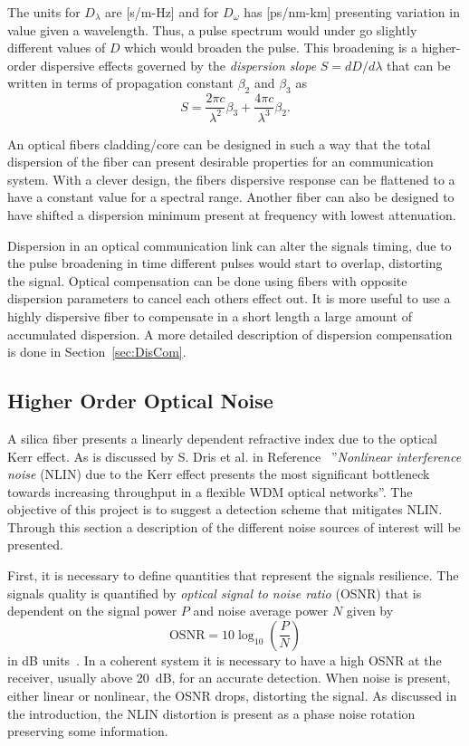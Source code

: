 The units for $D_\lambda$ are [s/m-Hz] and for $D_\omega$ has [ps/nm-km] presenting variation in value given a wavelength. Thus, a pulse spectrum would under go slightly different values of $D$ which would broaden the pulse. This broadening is a higher-order dispersive effects governed by the \emph{dispersion slope}   $S=dD/d\lambda$ that can be written in terms of propagation constant $\beta_2$ and $\beta_3$ as
\begin{equation}
S=\frac{2\pi c}{\lambda^2}\beta_3+\frac{4\pi c}{\lambda^3}\beta_2.
\end{equation}

An optical fibers cladding/core can be designed in such a way that the total dispersion of the fiber can present desirable properties for an communication system. With a clever design, the fibers dispersive response can be flattened to a have a constant value for a spectral range. Another fiber can also be designed to have shifted a dispersion minimum present at frequency with lowest attenuation. 

Dispersion in an optical communication link can alter the signals timing, due to the pulse broadening in time different pulses would start to overlap, distorting the signal. Optical compensation can be done using fibers with opposite dispersion parameters  to cancel each others effect out. It is more useful to use a highly dispersive fiber to compensate in a short length a large amount of accumulated dispersion. A more detailed description of dispersion compensation is done in Section~\ref{sec:DisCom}.  

\subsection{Higher Order Optical Noise}\label{sec:NLPN}
A silica fiber presents a linearly dependent refractive index due to the optical Kerr effect. As is discussed by S. Dris et al. in Reference~\cite{dris2017analysis} ''\textit{Nonlinear interference noise} (NLIN) due to the Kerr effect presents the most significant bottleneck towards increasing throughput in a flexible WDM optical networks''. The objective of this project is to suggest a detection scheme that mitigates NLIN.  Through this section a description of the different noise sources of interest will be presented. 

First, it is necessary to define quantities that represent the signals resilience.  The signals quality is quantified by  \textit{optical signal to noise ratio} (OSNR) that is dependent on the signal power $P$ and noise average power $N$ given by
\begin{equation}
\text{OSNR}=10\log_{10}\left(\frac{P}{N}\right)
\end{equation}
 in dB units~\cite{FiberAgrawal}. In a coherent system it is necessary to have a high OSNR at the receiver, usually above 20~dB, for an accurate detection. When noise is present, either linear or nonlinear, the OSNR drops, distorting the signal. As discussed in the introduction, the NLIN distortion is present as a phase noise rotation preserving some information. 
 
